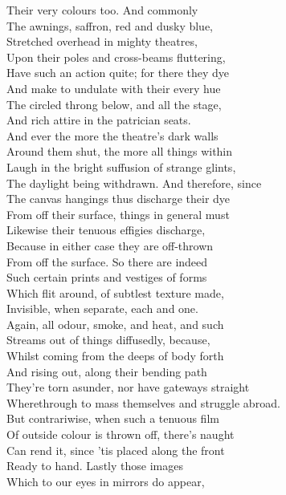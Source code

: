 Their very colours too. And commonly\\
The awnings, saffron, red and dusky blue,\\
Stretched overhead in mighty theatres,\\
Upon their poles and cross-beams fluttering,\\
Have such an action quite; for there they dye\\
And make to undulate with their every hue\\
The circled throng below, and all the stage,\\
And rich attire in the patrician seats.\\
And ever the more the theatre's dark walls\\
Around them shut, the more all things within\\
Laugh in the bright suffusion of strange glints,\\
The daylight being withdrawn. And therefore, since\\
The canvas hangings thus discharge their dye\\
From off their surface, things in general must\\
Likewise their tenuous effigies discharge,\\
Because in either case they are off-thrown\\
From off the surface. So there are indeed\\
Such certain prints and vestiges of forms\\
Which flit around, of subtlest texture made,\\
Invisible, when separate, each and one.\\
Again, all odour, smoke, and heat, and such\\
Streams out of things diffusedly, because,\\
Whilst coming from the deeps of body forth\\
And rising out, along their bending path\\
They're torn asunder, nor have gateways straight\\
Wherethrough to mass themselves and struggle abroad.\\
But contrariwise, when such a tenuous film\\
Of outside colour is thrown off, there's naught\\
Can rend it, since 'tis placed along the front\\
Ready to hand. Lastly those images\\
Which to our eyes in mirrors do appear,\\
